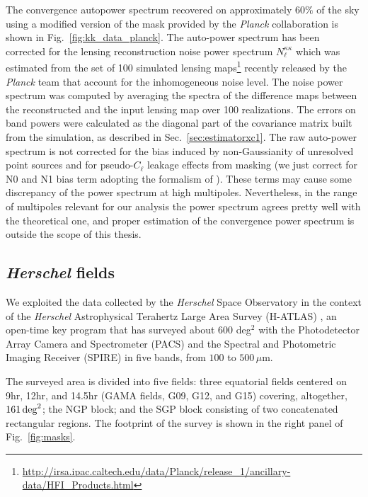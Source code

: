 The convergence autopower spectrum recovered on approximately $60\%$ of the sky using a modified version of the mask provided by the \textit{Planck} collaboration is shown in Fig.~\eqref{fig:kk_data_planck}. The auto-power spectrum has been corrected for the lensing reconstruction noise power spectrum  $N_{\ell}^{\kappa\kappa}$ which was estimated from the set of 100 simulated lensing maps\footnote{\url{http://irsa.ipac.caltech.edu/data/Planck/release_1/ancillary-data/HFI_Products.html}} recently released by the \emph{Planck} team that account for the inhomogeneous noise level. The noise power spectrum was computed by averaging the spectra of the difference maps between the reconstructed and the input lensing map over 100 realizations. The errors on band powers were calculated as the diagonal part of the covariance matrix built from the simulation, as described in Sec.~\eqref{sec:estimatorxc1}. The raw auto-power spectrum is not corrected for the bias induced by non-Gaussianity of unresolved point sources and for pseudo-$C_{\ell}$ leakage effects from masking (we just correct for N0 and N1 bias term adopting the formalism of \cite{Ade2014c}). These terms may cause some discrepancy of the power spectrum at high multipoles. Nevertheless, in the range of multipoles relevant for our analysis the power spectrum agrees pretty well with the theoretical one, and proper estimation of the convergence power spectrum is outside the scope of this thesis.

\subsection{\textit{Herschel} fields}
\label{subsec:herschel}

We exploited the data collected by the \textit{Herschel} Space Observatory \citep{Pilbratt2010} in the context of the \textit{Herschel} Astrophysical Terahertz Large Area Survey (H-ATLAS) \citep{Eales2010a}, an open-time key program that has surveyed about $600$ deg$^2$ with the Photodetector Array Camera and Spectrometer (PACS) \citep{Poglitsch2010} and the Spectral and Photometric Imaging Receiver (SPIRE) \citep{Griffin2010} in five bands, from $100$ to $500\,\mu$m. 

The surveyed area is divided into five fields: three equatorial fields centered on 9hr, 12hr, and 14.5hr (GAMA fields, G09, G12, and G15) covering, altogether, $161\,\hbox{deg}^2$; the NGP block; and the SGP block consisting of two concatenated rectangular regions. The footprint of the survey is shown in the right panel of Fig.~\eqref{fig:masks}.

